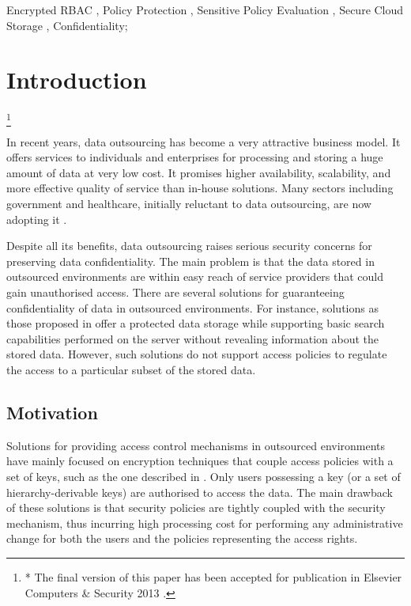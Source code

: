 \documentclass[final,5p,times,twocolumn]{elsarticle}
\newcommand\blfootnote[1]{\begingroup
  \renewcommand\thefootnote{}\footnote{#1}\addtocounter{footnote}{-1}\endgroup
}
\begin{document}
\begin{frontmatter}
\begin{abstract}
\end{abstract}

\begin{keyword}
Encrypted RBAC \sep
Policy Protection \sep 
Sensitive Policy Evaluation \sep
Secure Cloud Storage \sep 
Confidentiality;



\end{keyword}

\end{frontmatter}



\section{Introduction}
\blfootnote{* The final version of this paper has been accepted for publication in Elsevier Computers \& Security 2013 \cite{Asghar2013-COSE}.}In recent years, data outsourcing has become a very attractive business model. It offers services to individuals and enterprises for processing and storing a huge amount of data at very low cost. It promises higher availability, scalability, and more effective quality of service than in-house solutions. Many sectors including government and healthcare, initially reluctant to data outsourcing, are now adopting it \cite{Ondo2006}.

Despite all its benefits, data outsourcing raises serious security concerns for preserving data confidentiality. The main problem is that the data stored in outsourced environments are within easy reach of service providers that could gain unauthorised access. There are several solutions for guaranteeing confidentiality of data in outsourced environments. For instance, solutions as those proposed in \cite{Dong2011, Kamara2010} offer a protected data storage while supporting basic search capabilities performed on the server without revealing information about the stored data. However, such solutions do not support access policies to regulate the access to a particular subset of the stored data.

\subsection{Motivation}
Solutions for providing access control mechanisms in outsourced environments have mainly focused on encryption techniques that couple access policies with a set of keys, such as the one described in \cite{Vimercati2008}. Only users possessing a key (or a set of hierarchy-derivable keys) are authorised to access the data. The main drawback of these solutions is that security policies are tightly coupled with the security mechanism, thus incurring high processing cost for performing any administrative change for both the users and the policies representing the access rights.
\end{document}
